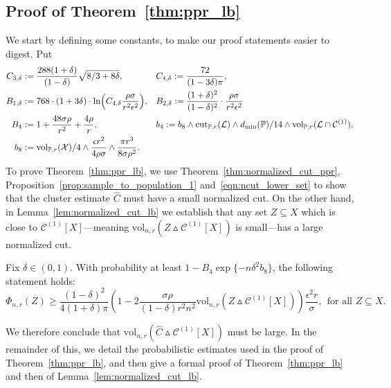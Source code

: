 \documentclass[twoside,11pt]{article}
\newcommand{\1}{\mathbf{1}}
\newcommand{\mc}[1]{\mathcal{#1}}
\newcommand{\Pbb}{\mathbb{P}}
\newcommand{\wh}[1]{\widehat{#1}}
\newcommand{\vol}{\mathrm{vol}}
\newcommand{\cut}{\mathrm{cut}}
\begin{document}
\subsection{Proof of Theorem~\ref{thm:ppr_lb}}
We start by defining some constants, to make our proof statements easier to digest. Put
\begin{align*}
C_{3,\delta} & := \frac{288(1 + \delta)}{(1 - \delta)} \sqrt{8/3 + 8 \delta}
,&&C_{4,\delta} := \frac{72}{(1 - 3\delta)\pi}, \\
B_{1,\delta} & := 768 \cdot (1 + 3\delta) \cdot \ln\Bigl(C_{4,\delta} \frac{\rho\sigma}{r^2 \epsilon^2} \Bigr),&&B_{2,\delta} := \frac{(1 + \delta)^2}{(1 - \delta)^2} \cdot \frac{\rho \sigma}{r^2 \epsilon^2} \\
B_4 & := 1 + \frac{48\sigma\rho}{r^2} + \frac{4\rho}{r},&&b_4 :=  b_8 \wedge \cut_{\Pbb,r}(\mc{L}) \wedge d_{\min}(\Pbb)/14 \wedge \vol_{\Pbb,r}(\mc{L} \cap \mc{C}^{(1)}), \\
b_8 &:= \vol_{\Pbb,r}(\mc{X})/4 \wedge \frac{\epsilon r^2}{4\rho\sigma} \wedge \frac{\pi r^3}{8\sigma \rho^2}.
\end{align*}
To prove Theorem~\ref{thm:ppr_lb}, we use Theorem~\ref{thm:normalized_cut_ppr}, Proposition~\ref{prop:sample_to_population_1} and~\eqref{eqn:ncut_lower_set} to show that the cluster estimate $\wh{C}$ must have a small normalized cut. On the other hand, in Lemma~\ref{lem:normalized_cut_lb} we establish that any set $Z \subseteq X$ which is close to $\mc{C}^{(1)}[X]$---meaning $\vol_{n,r}(Z \vartriangle \mc{C}^{(1)}[X])$ is small---has a large normalized cut.
\begin{lemma}
	\label{lem:normalized_cut_lb}
	Fix $\delta \in (0,1)$. With probability at least $1 - B_4\exp\{-n\delta^2b_8\}$, the following statement holds:
	\begin{equation}
	\label{eqn:normalized_cut_lb}
	\Phi_{n,r}(Z) \geq \frac{(1 - \delta)^2}{4(1 + \delta)\pi} \left(1 - 2 \frac{\sigma \rho}{(1 - \delta) r^2 n^2} \vol_{n,r}(Z \vartriangle \mc{C}^{(1)}[X]) \right) \frac{\epsilon^2 r}{\sigma},~~\textrm{for all $Z \subseteq X$}.
	\end{equation}
\end{lemma}
We therefore conclude that $\vol_{n,r}(\wh{C} \vartriangle \mc{C}^{(1)}[X])$ must be large. In the remainder of this, we detail the probabilistic estimates used in the proof of Theorem~\ref{thm:ppr_lb}, and then give a formal proof of Theorem~\ref{thm:ppr_lb} and then of Lemma~\ref{lem:normalized_cut_lb}.\\
\end{document}
